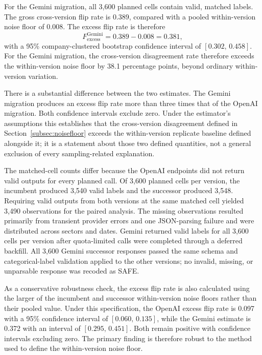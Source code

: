 \documentclass{ieeeaccess}
\begin{document}
For the Gemini migration, all 3{,}600 planned cells contain valid, matched labels. The gross cross-version flip rate is 0.389, compared with a pooled within-version noise floor of 0.008. The excess flip rate is therefore
\begin{equation}
F_{\mathrm{excess}}^{\mathrm{Gemini}} = 0.389-0.008 = 0.381,
\end{equation}
with a 95\% company-clustered bootstrap confidence interval of $[0.302,\,0.458]$. For the Gemini migration, the cross-version disagreement rate therefore exceeds the within-version noise floor by 38.1 percentage points, beyond ordinary within-version variation.

There is a substantial difference between the two estimates. The Gemini migration produces an excess flip rate more than three times that of the OpenAI migration. Both confidence intervals exclude zero. Under the estimator's assumptions this establishes that the cross-version disagreement defined in Section~\ref{subsec:noisefloor} exceeds the within-version replicate baseline defined alongside it; it is a statement about those two defined quantities, not a general exclusion of every sampling-related explanation.

The matched-cell counts differ because the OpenAI endpoints did not return valid outputs for every planned call. Of 3{,}600 planned cells per version, the incumbent produced 3{,}540 valid labels and the successor produced 3{,}548. Requiring valid outputs from both versions at the same matched cell yielded 3{,}490 observations for the paired analysis. The missing observations resulted primarily from transient provider errors and one JSON-parsing failure and were distributed across sectors and dates. Gemini returned valid labels for all 3{,}600 cells per version after quota-limited calls were completed through a deferred backfill. All 3{,}600 Gemini successor responses passed the same schema and categorical-label validation applied to the other versions; no invalid, missing, or unparsable response was recoded as SAFE.

As a conservative robustness check, the excess flip rate is also calculated using the larger of the incumbent and successor within-version noise floors rather than their pooled value. Under this specification, the OpenAI excess flip rate is 0.097 with a 95\% confidence interval of $[0.060,\,0.135]$, while the Gemini estimate is 0.372 with an interval of $[0.295,\,0.451]$. Both remain positive with confidence intervals excluding zero. The primary finding is therefore robust to the method used to define the within-version noise floor.
\end{document}

